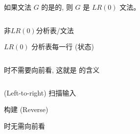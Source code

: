 \begin{frame}{}
  \begin{definition}[$LR(0)$文法]
    如果文法 $G$ 的是的,
    则 $G$ 是 $LR(0)$ 文法。
  \end{definition}

  \begin{center}
    \begin{columns}
        
    \end{columns}

    \vspace{0.20cm}
    非$LR(0)$分析表/文法
  \end{center}
\end{frame}

\begin{frame}{}
  \begin{center}
    $LR(0)$ 分析表每一行 (状态) 

    \begin{columns}
        
    \end{columns}

    \vspace{0.20cm}
    时不需要向前看, 这就是  的含义
  \end{center}
\end{frame}

\begin{frame}{}
  \begin{center}

    \vspace{0.80cm}
    \begin{columns}
        \begin{description}
          \setlength{\itemsep}{15pt}
          \item[$L:$]  (Left-to-right) 扫描输入
          \item[$R:$] 构建 (Reverse) 
          \item[$0:$] 时无需向前看
        \end{description}
    \end{columns}
  \end{center}
\end{frame}

